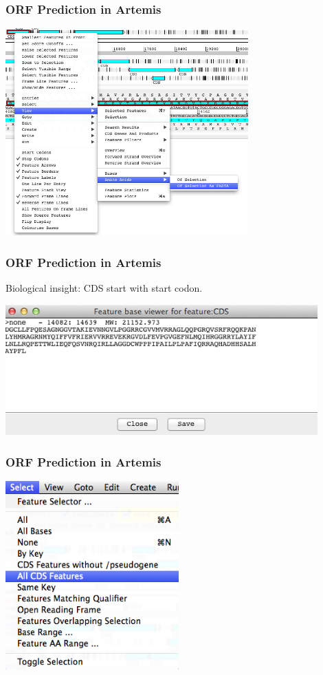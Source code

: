 \documentclass[table]{beamer}
\begin{document}
    \begin{frame}
      \frametitle{ORF Prediction in Artemis}    
      \begin{center}
        \includegraphics[width=0.7\textwidth]{images/artemis_orf5}     
      \end{center}
    \end{frame} 

    \begin{frame}
      \frametitle{ORF Prediction in Artemis}
      Biological insight: CDS start with start codon.
      \begin{center}
        \includegraphics[width=0.9\textwidth]{images/artemis_orf6}     
      \end{center}
    \end{frame} 

    \begin{frame}
      \frametitle{ORF Prediction in Artemis}    
      \begin{center}
        \includegraphics[width=0.5\textwidth]{images/artemis_orf7}     
      \end{center}
    \end{frame} 
\end{document}
